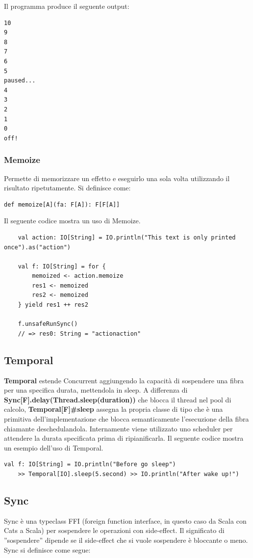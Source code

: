 Il programma produce il seguente output:
\begin{verbatim}
10
9
8
7
6
5
paused...
4
3
2
1
0
off!
\end{verbatim}

\subsubsection{Memoize}
Permette di memorizzare un effetto e eseguirlo una sola volta utilizzando il risultato ripetutamente. Si definisce come:
\begin{verbatim}
def memoize[A](fa: F[A]): F[F[A]]    
\end{verbatim}
Il seguente codice mostra un uso di Memoize.
\begin{verbatim}
    val action: IO[String] = IO.println("This text is only printed once").as("action")

    val f: IO[String] = for {
        memoized <- action.memoize
        res1 <- memoized
        res2 <- memoized
    } yield res1 ++ res2

    f.unsafeRunSync()
    // => res0: String = "actionaction"
\end{verbatim}
\subsection{Temporal}
\textbf{Temporal} estende Concurrent aggiungendo la capacità di sospendere una fibra per una specifica durata, mettendola in sleep. A differenza di \textbf{Sync[F].delay(Thread.sleep(duration))} che blocca il thread nel pool di calcolo, \textbf{Temporal[F]\#sleep} assegna la propria classe di tipo che è una primitiva dell'implementazione che blocca semanticamente l'esecuzione della fibra chiamante deschedulandola. Internamente viene utilizzato uno scheduler per attendere la durata specificata prima di ripianificarla. Il seguente codice mostra un esempio dell'uso di Temporal.

\begin{verbatim}
val f: IO[String] = IO.println("Before go sleep")
    >> Temporal[IO].sleep(5.second) >> IO.println("After wake up!")
\end{verbatim}


\subsection{Sync}
Sync è una typeclass FFI (foreign function interface, in questo caso da Scala con Cats a Scala) per sospendere le operazioni con side-effect. Il significato di ”sospendere” dipende se il side-effect che si vuole sospendere è bloccante o meno. Sync si definisce come segue:

